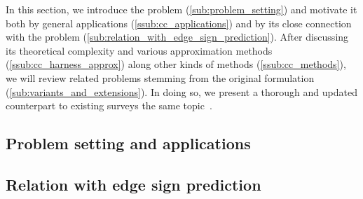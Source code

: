 
In this section, we introduce the \pcc{} problem (\autoref{sub:problem_setting}) and motivate it
both by general applications (\autoref{ssub:cc_applications}) and by its close connection with the
\esp{} problem (\autoref{sub:relation_with_edge_sign_prediction}). After discussing its theoretical
complexity and various approximation methods (\autoref{ssub:cc_harness_approx}) along other kinds of
methods (\autoref{ssub:cc_methods}), we will review related problems stemming from the original
formulation (\autoref{sub:variants_and_extensions}). In doing so, we present a thorough and updated
counterpart to existing surveys the same
topic~\autocites{bonchi2014correlation}{surveyCC16}{CCWirth2017}.


\subsection{Problem setting and applications}
\label{sub:problem_setting}


\subsection{Relation with edge sign prediction}
\label{sub:relation_with_edge_sign_prediction}


